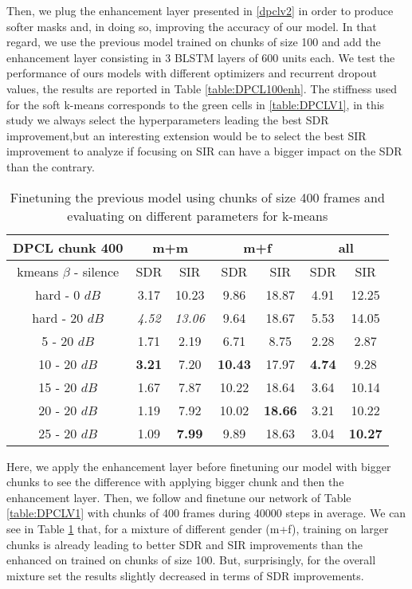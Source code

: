 \documentclass[master,final,11pt]{iscs-thesis}
\begin{document}
Then, we plug the enhancement layer presented in \ref{dpclv2} in order to produce softer masks and, in doing so, improving the accuracy of our model. In that regard, we use the previous model trained on chunks of size 100 and add the enhancement layer consisting in 3 BLSTM layers of 600 units each. We test the performance of ours models with different optimizers and recurrent dropout values, the results are reported in Table \ref{table:DPCL100enh}. The stiffness used for the soft k-means corresponds to the green cells in \ref{table:DPCLV1}, in this study we always select the hyperparameters leading the best SDR improvement,but an interesting extension would be to select the best SIR improvement to analyze if focusing on SIR can have a bigger impact on the SDR than the contrary.

\begin{table}[h]
\centering
\begin{tabular}{c|c|c|c|c|c|c}
DPCL chunk 400 & \multicolumn{2}{c|}{m+m} & \multicolumn{2}{c|}{m+f} & \multicolumn{2}{c}{all} \\ 
\hline 
kmeans $\beta$ - silence & SDR & SIR & SDR & SIR & SDR & SIR \\ 
\hline 
hard - 0 $dB$ & 3.17 & 10.23  & 9.86 & 18.87 & 4.91 & 12.25 \\ 
hard - 20 $dB$ & \textit{4.52} & \textit{13.06} & 9.64 & 18.67 & 5.53 & 14.05 \\ 
\hline 
\hline 
5 - 20 $dB$ & 1.71 & 2.19 & 6.71 & 8.75 & 2.28 & 2.87 \\ 
10 - 20 $dB$ & \cellcolor{green}\textbf{3.21} & \cellcolor{green}7.20 & \cellcolor{green}\textbf{10.43} & \cellcolor{green}17.97 & \cellcolor{green}\textbf{4.74} & \cellcolor{green}9.28 \\ 
15 - 20 $dB$ & 1.67 & 7.87 & 10.22 & 18.64 & 3.64 & 10.14 \\ 
20 - 20 $dB$ & 1.19 & 7.92 & 10.02 & \textbf{18.66} & 3.21 & 10.22 \\ 
25 - 20 $dB$ & 1.09 & \textbf{7.99} & 9.89 & 18.63 & 3.04 & \textbf{10.27} \\ 
\end{tabular}
\captionsetup{justification=centering}
\caption{Finetuning the previous model using chunks of size 400 frames and evaluating on different parameters for k-means}
\label{table:DPCL400}
\end{table}

Here, we apply the enhancement layer before finetuning our model with bigger chunks to see the difference with applying bigger chunk and then the enhancement layer. 
Then, we follow \cite{DPCLV2} and finetune our network of Table \ref{table:DPCLV1} with chunks of 400 frames during 40000 steps in average. We can see in Table \ref{table:DPCL400} that, for a mixture of different gender (m+f), training on larger chunks is already leading to better SDR and SIR improvements than the enhanced on trained on chunks of size 100. But, surprisingly, for the overall mixture set the results slightly decreased in terms of SDR improvements.
\end{document}
